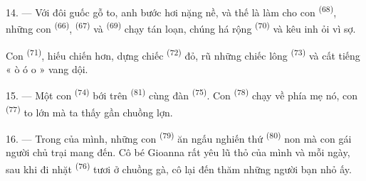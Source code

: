 14. --- Với đôi guốc gỗ to, anh bước hơi nặng nề, và thế là làm cho con  \textsuperscript{(68)}, những con  \textsuperscript{(66)},
 \textsuperscript{(67)} và  \textsuperscript{(69)} chạy
tán loạn, chúng há rộng  \textsuperscript{(70)} và kêu inh ỏi vì sợ.

Con  \textsuperscript{(71)}, hiếu chiến hơn, dựng chiếc 
\textsuperscript{(72)} đỏ, rũ những chiếc lông  \textsuperscript{(73)} và
cất tiếng « ò ó o » vang dội.

15. --- Một con  \textsuperscript{(74)} bới trên 
\textsuperscript{(81)} cùng đàn  \textsuperscript{(75)}. Con  \textsuperscript{(78)} chạy về phía mẹ nó, con 
\textsuperscript{(77)} to lớn mà ta thấy gần chuồng lợn.

16. --- Trong  của mình, những con  \textsuperscript{(79)} ăn
ngấu nghiến thứ  \textsuperscript{(80)} non mà con gái người chủ trại mang
đến. Cô bé Gioanna rất yêu lũ thỏ của mình và mỗi ngày, sau khi đi nhặt 
\textsuperscript{(76)} tươi ở chuồng gà, cô lại đến thăm những người bạn nhỏ ấy.
\VUsaut{6.0mm}
\VUfilet{22mm}
